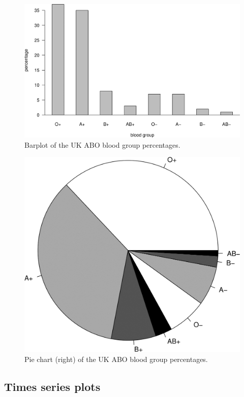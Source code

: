 \documentclass[
  british,
]{book}
\begin{document}
\begin{figure}

{\centering \includegraphics[width=0.8\linewidth]{images/ABO_barplots} 

}

\caption{Barplot of the UK ABO blood group percentages.}\label{fig:ABObar}
\end{figure}
\FloatBarrier

\begin{figure}

{\centering \includegraphics[width=0.75\linewidth]{images/ABO_pie} 

}

\caption{Pie chart (right) of the UK ABO blood group percentages.}\label{fig:ABOpie}
\end{figure}
\FloatBarrier

\hypertarget{times-series-plots}{%
\subsection{Times series plots}\label{times-series-plots}}
\end{document}
